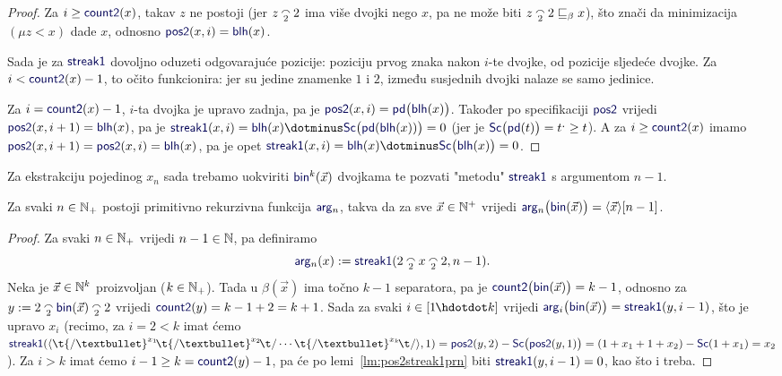 \begin{proof}
Za $i\ge\f{count2}(x)$, takav $z$ ne postoji (jer $z\conc22$ ima više dvojki nego $x$, pa ne može biti $z\conc22\sqsubseteq_\beta x$), što znači da minimizacija $(\mu z<x)$ dade $x$, odnosno $\f{pos2}(x,i)=\f{blh}(x)$.

Sada je za $\f{streak1}$ dovoljno oduzeti odgovarajuće pozicije: poziciju prvog znaka nakon $i$-te dvojke, od pozicije sljedeće dvojke. Za $i<\f{count2}(x)-1$, to očito funkcionira: jer su jedine znamenke $1$ i $2$, između susjednih dvojki nalaze se samo jedinice.

	Za $i=\f{count2}(x)-1$, $i$-ta dvojka je upravo zadnja, pa je $\f{pos2}(x,i)=\f{pd}\bigl(\f{blh}(x)\bigr)$. Također po specifikaciji $\f{pos2}$ vrijedi $\f{pos2}(x,i+1)=\f{blh}(x)$, pa je $\f{streak1}(x,i)=\f{blh}(x)\dotminus\f{Sc}\bigl(\f{pd}(\f{blh}(x))\bigr)=0$ (jer je $\f{Sc}\bigl(\f{pd}(t)\bigr)=t\bump\ge t$). A za $i\ge\f{count2}(x)$ imamo $\f{pos2}(x,i+1)=\f{pos2}(x,i)=\f{blh}(x)$, pa je opet $\f{streak1}(x,i)=\f{blh}(x)\dotminus\f{Sc}\bigl(\f{blh}(x)\bigr)=0$.
\end{proof}


Za ekstrakciju pojedinog $x_n$ sada trebamo uokviriti $\f{bin}^k(\vec x)$ dvojkama te pozvati "metodu" $\f{streak1}$ s argumentom $n-1$.

\begin{propozicija}[{name=[primitivna rekurzivnost ekstrakcije argumenata]}]\label{pp:argnprn}
    Za svaki $n\in{\mathbb N}_+$ postoji primitivno rekurzivna funkcija $\f{arg}_n$, takva da za sve $\vec x\in{\mathbb N}^+$ vrijedi $\f{arg}_n\bigl(\f{bin}(\vec x)\bigr)=\kr{\vec x}[n-1]$.
\end{propozicija}

\begin{proof}
Za svaki $n\in{\mathbb N}_+$ vrijedi $n-1\in{\mathbb N}$, pa definiramo
\begin{equation}
    \f{arg}_n(x):=\f{streak1}(2\conc2x\conc22,n-1)\text.
\end{equation}
	Neka je $\vec x\in{\mathbb N}^k$ proizvoljan ($k\in{\mathbb N}_+$). Tada u $\beta(\vec x)$ ima točno $k-1$ separatora, pa je $\f{count2}\bigl(\f{bin}(\vec x)\bigr)=k-1$, odnosno za $y:=2\conc2\f{bin}(\vec x)\conc22$ vrijedi $\f{count2}(y)=k-1+2=k+1$. Sada za svaki $i\in[1\mspace{-1mu}\dd k]$ vrijedi $\f{arg}_i\bigl(\f{bin}(\vec x)\bigr)=\f{streak1}(y,i-1)$, što je upravo $x_i$ (recimo, za $i=2<k$ imat ćemo $\f{streak1}(\kr{\t{/\textbullet}^{x_1}\!\t{/\textbullet}^{x_2}\!\t/\dotsm\t{/\textbullet}^{x_k}\!\t/},1)=\f{pos2}(y,2)-\f{Sc}\bigl(\f{pos2}(y,1)\bigr)=(1+x_1+1+x_2)-\f{Sc}(1+x_1)=x_2$).
Za $i>k$ imat ćemo $i-1\ge k=\f{count2}(y)-1$, pa će po lemi~\ref{lm:pos2streak1prn} biti $\f{streak1}(y,i-1)=0$, kao što i treba.
\end{proof}

